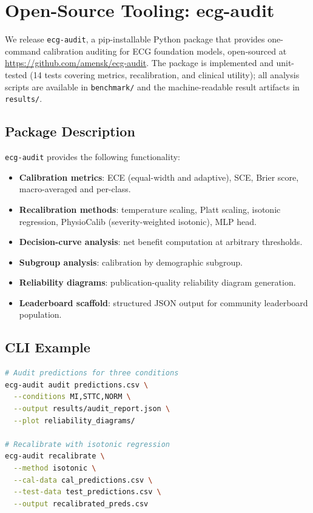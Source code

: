\section{Open-Source Tooling: ecg-audit}
\label{sec:open_source}

We release \texttt{ecg-audit}, a pip-installable Python package that provides
one-command calibration auditing for ECG foundation models, open-sourced at
\url{https://github.com/amensk/ecg-audit}. The package is implemented and unit-tested
(14 tests covering metrics, recalibration, and clinical utility); all analysis scripts are
available in \texttt{benchmark/} and the machine-readable result artifacts in \texttt{results/}.

\subsection{Package Description}

\texttt{ecg-audit} provides the following functionality:
\begin{itemize}
  \item \textbf{Calibration metrics}: ECE (equal-width and adaptive), SCE, Brier score,
    macro-averaged and per-class.
  \item \textbf{Recalibration methods}: temperature scaling, Platt scaling, isotonic
    regression, PhysioCalib (severity-weighted isotonic), MLP head.
  \item \textbf{Decision-curve analysis}: net benefit computation at arbitrary thresholds.
  \item \textbf{Subgroup analysis}: calibration by demographic subgroup.
  \item \textbf{Reliability diagrams}: publication-quality reliability diagram generation.
  \item \textbf{Leaderboard scaffold}: structured JSON output for community leaderboard
    population.
\end{itemize}

\subsection{CLI Example}

\begin{lstlisting}[language=bash, basicstyle=\ttfamily\small, frame=single]
# Audit predictions for three conditions
ecg-audit audit predictions.csv \
  --conditions MI,STTC,NORM \
  --output results/audit_report.json \
  --plot reliability_diagrams/

# Recalibrate with isotonic regression
ecg-audit recalibrate \
  --method isotonic \
  --cal-data cal_predictions.csv \
  --test-data test_predictions.csv \
  --output recalibrated_preds.csv
\end{lstlisting}

